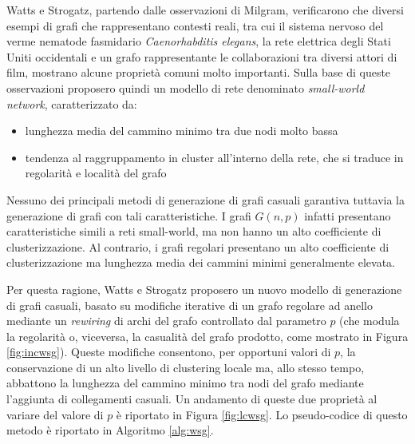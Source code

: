 Watts e Strogatz, partendo dalle osservazioni di Milgram, verificarono che diversi esempi di grafi che rappresentano contesti reali, tra cui il sistema nervoso del verme nematode fasmidario \textit{Caenorhabditis elegans}, la rete elettrica degli Stati Uniti occidentali e un grafo rappresentante le collaborazioni tra diversi attori di film, mostrano alcune proprietà comuni molto importanti. Sulla base di queste osservazioni proposero quindi un modello di rete denominato \textit{small-world network}, caratterizzato da:
\begin{itemize}
\item lunghezza media del cammino minimo tra due nodi molto bassa
\item tendenza al raggruppamento in cluster all'interno della rete, che si traduce in regolarità e località del grafo
\end{itemize}

Nessuno dei principali metodi di generazione di grafi casuali garantiva tuttavia la generazione di grafi con tali caratteristiche. I grafi $G(n,p)$ infatti presentano caratteristiche simili a reti small-world, ma non hanno un alto coefficiente di clusterizzazione. Al contrario, i grafi regolari presentano un alto coefficiente di clusterizzazione ma lunghezza media dei cammini minimi generalmente elevata. 

Per questa ragione, Watts e Strogatz proposero un nuovo modello di generazione di grafi casuali,  basato su modifiche iterative di un grafo regolare ad anello mediante un \textit{rewiring} di archi del grafo controllato dal parametro $p$ (che modula la regolarità o, viceversa, la casualità del grafo prodotto, come mostrato in Figura \ref{fig:incwsg}). Queste modifiche consentono, per opportuni valori di $p$,  la conservazione di un alto livello di clustering locale ma, allo stesso tempo, abbattono la lunghezza del cammino minimo tra nodi del grafo mediante l'aggiunta di collegamenti casuali.  Un andamento di queste due proprietà al variare del valore di $p$ è riportato in Figura \ref{fig:lcwsg}. Lo pseudo-codice di questo metodo è riportato in Algoritmo \ref{alg:wsg}.


